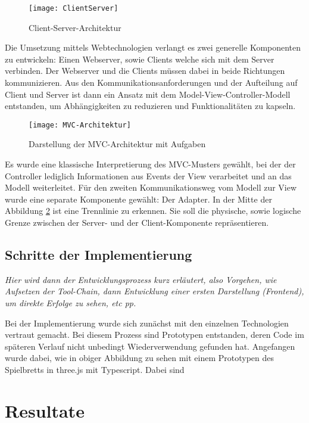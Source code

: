 \begin{figure}[htp]
	\centering
	\captionsetup{justification=centering}
	\texttt{[image: ClientServer]}
	\caption[Client-Server-Architektur]{Client-Server-Architektur}
	\label{fig:Client-Server-Architektur}
\end{figure}
Die Umsetzung mittels Webtechnologien verlangt es zwei generelle Komponenten zu entwickeln: Einen Webserver, sowie Clients welche sich mit dem Server verbinden.
Der Webserver und die Clients müssen dabei in beide Richtungen kommunizieren.
Aus den Kommunikationsanforderungen und der Aufteilung auf Client und Server ist dann ein Ansatz mit dem Model-View-Controller-Modell entstanden, um Abhängigkeiten zu reduzieren und Funktionalitäten zu kapseln.
\begin{figure}[h]
	\centering
	\captionsetup{justification=centering}
	\texttt{[image: MVC-Architektur]}
	\caption[MVC]{Darstellung der MVC-Architektur mit Aufgaben}
	\label{fig:MVC}
\end{figure}
Es wurde eine klassische Interpretierung des MVC-Musters gewählt, bei der der Controller lediglich Informationen aus Events der View verarbeitet und an das Modell weiterleitet. Für den zweiten Kommunikationsweg vom Modell zur View wurde eine separate Komponente gewählt: Der Adapter.
In der Mitte der Abbildung \ref{fig:MVC} ist eine Trennlinie zu erkennen. Sie soll die physische, sowie logische Grenze zwischen der Server- und der Client-Komponente repräsentieren.


\subsection{Schritte der Implementierung}
\label{subsec:Implementierung}

\emph{Hier wird dann der Entwicklungsprozess kurz erläutert, also Vorgehen, wie Aufsetzen der Tool-Chain, dann Entwicklung einer ersten Darstellung (Frontend), um direkte Erfolge zu sehen, etc pp.}

Bei der Implementierung wurde sich zunächst mit den einzelnen Technologien vertraut gemacht. Bei diesem Prozess sind Prototypen entstanden, deren Code im späteren Verlauf nicht unbedingt Wiederverwendung gefunden hat.
Angefangen wurde dabei, wie in obiger Abbildung zu sehen mit einem Prototypen des Spielbretts in three.js mit Typescript. Dabei sind 

\section{Resultate}
\label{sec:Resultate}

